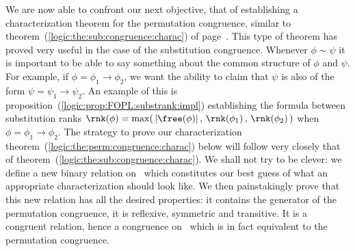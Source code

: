 We are now able to confront our next objective, that of establishing
a characterization theorem for the permutation congruence, similar
to theorem~(\ref{logic:the:sub:congruence:charac}) of
page~\pageref{logic:the:sub:congruence:charac}. This type of theorem
has proved very useful in the case of the substitution congruence.
Whenever $\phi\sim\psi$ it is important to be able to say something
about the common structure of $\phi$ and $\psi$. For example, if
$\phi=\phi_{1}\to\phi_{2}$, we want the ability to claim that $\psi$
is also of the form $\psi=\psi_{1}\to\psi_{2}$. An example of this
is proposition~(\ref{logic:prop:FOPL:substrank:impl}) establishing
the formula between substitution ranks
$\rnk(\phi)=\max(\,|\free(\phi)|\,,\,\rnk(\phi_{1})\,,\,\rnk(\phi_{2})\,)$
when $\phi=\phi_{1}\to\phi_{2}$. The strategy to prove our
characterization theorem~(\ref{logic:the:perm:congruence:charac})
below will follow very closely that of
theorem~(\ref{logic:the:sub:congruence:charac}). We shall not try to
be clever: we define a new binary relation on \pv\ which constitutes
our best guess of what an appropriate characterization should look
like. We then painstakingly prove that this new relation has all the
desired properties: it contains the generator of the permutation
congruence, it is reflexive, symmetric and transitive. It is a
congruent relation, hence a congruence on \pv\ which is in fact
equivalent to the permutation congruence.


